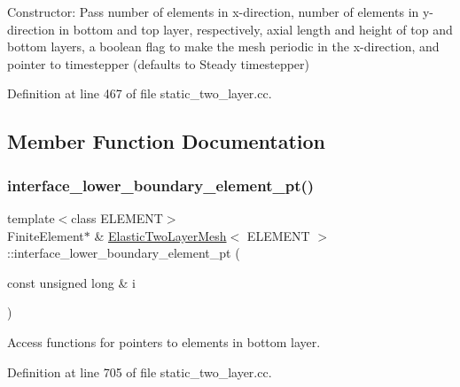 Constructor\+: Pass number of elements in x-\/direction, number of elements in y-\/direction in bottom and top layer, respectively, axial length and height of top and bottom layers, a boolean flag to make the mesh periodic in the x-\/direction, and pointer to timestepper (defaults to Steady timestepper) 



Definition at line 467 of file static\+\_\+two\+\_\+layer.\+cc.



\subsection{Member Function Documentation}
\mbox{\label{classElasticTwoLayerMesh_a748ff5229092301a18a193a846d2ebdd}} 
\subsubsection{\texorpdfstring{interface\+\_\+lower\+\_\+boundary\+\_\+element\+\_\+pt()}{interface\_lower\_boundary\_element\_pt()}}
{\footnotesize\ttfamily template$<$class E\+L\+E\+M\+E\+NT$>$ \\
Finite\+Element$\ast$ \& \hyperlink{classElasticTwoLayerMesh}{Elastic\+Two\+Layer\+Mesh}$<$ E\+L\+E\+M\+E\+NT $>$\+::interface\+\_\+lower\+\_\+boundary\+\_\+element\+\_\+pt (\begin{DoxyParamCaption}\item[{const unsigned long \&}]{i }\end{DoxyParamCaption})\hspace{0.3cm}{\ttfamily [inline]}}



Access functions for pointers to elements in bottom layer. 



Definition at line 705 of file static\+\_\+two\+\_\+layer.\+cc.

\mbox{\label{classElasticTwoLayerMesh_a100b3b26d4a2b97f67b0bef4e4b42e64}} 
